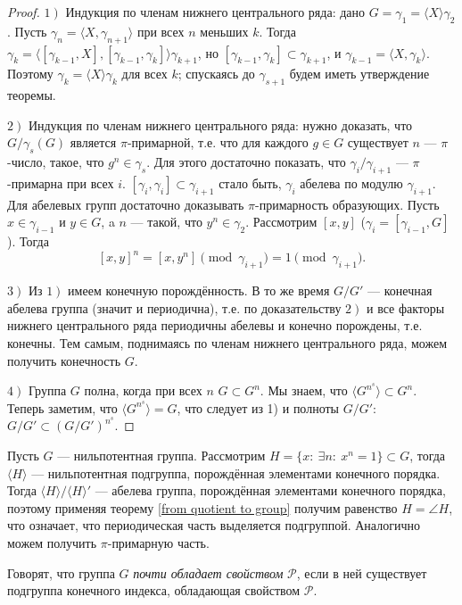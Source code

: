 \documentclass[10pt,a4paper,draft]{article}
\begin{document}
\begin{proof} $\left.1\right)$ Индукция по членам нижнего центрального
ряда: дано $G=\gamma_1=\langle X\rangle\gamma_2$. Пусть
$\gamma_n=\langle X,\gamma_{n+1}\rangle$ при всех $n$ меньших $k$.
Тогда
$\gamma_k=\langle{[\gamma_{k-1},X],[\gamma_{k-1},\gamma_k]}\rangle\gamma_{k+1}$,
но $[\gamma_{k-1},\gamma_k]\subset\gamma_{k+1}$, и
$\gamma_{k-1}=\langle X,\gamma_k\rangle$. Поэтому
$\gamma_k=\langle X\rangle\gamma_k$ для всех $k$; спускаясь до
$\gamma_{s+1}$ будем иметь утверждение теоремы.

$\left.2\right)$ Индукция по членам нижнего центрального ряда:
нужно доказать, что $G/\gamma_s(G)$ является $\pi$-примарной, т.е. что
для каждого $g\in G$ существует $n$ --- $\pi$-число, такое, что
$g^n\in\gamma_s$. Для этого достаточно показать, что
$\gamma_i/\gamma_{i+1}$ --- $\pi$-примарна при всех $i$.
$[\gamma_i,\gamma_i]\subset\gamma_{i+1}$ стало быть, $\gamma_i$
абелева по модулю $\gamma_{i+1}$. Для абелевых групп достаточно
доказывать $\pi$-примарность образующих. Пусть $x\in\gamma_{i-1}$
и $y\in G$, a $n$ --- такой, что $y^n\in\gamma_2$. Рассмотрим
$[x,y]$ ($\gamma_i=[\gamma_{i-1},G]$). Тогда
$$[x,y]^n=[x,y^n]\pmod{\gamma_{i+1}}=1\pmod{\gamma_{i+1}}.$$

$\left.3\right)$ Из $\left.1\right)$ имеем конечную порождённость.
В то же время $G/G'$
--- конечная абелева группа (значит и периодична), т.е. по доказательству $\left.2\right)$
и все факторы нижнего центрального ряда периодичны абелевы и
конечно порождены, т.е. конечны. Тем самым, поднимаясь по членам
нижнего центрального ряда, можем получить конечность $G$.

$\left.4\right)$  Группа $G$ полна, когда при всех $n$ $G\subset
G^n$. Мы знаем, что $\langle G^{n^s}\rangle\subset G^n$. Теперь
заметим, что $\langle G^{n^s}\rangle=G$, что следует из 1) и
полноты $G/G'$: $G/G'\subset(G/G')^{n^{s}}$.\end{proof}

Пусть $G$ --- нильпотентная группа. Рассмотрим $H=\{x:~\exists
n:~x^n=1\}\subset G$, тогда $\langle H\rangle$
--- нильпотентная подгруппа, порождённая элементами конечного порядка. Тогда
$\langle H\rangle/\langle H\rangle'$ --- абелева группа,
порождённая элементами конечного порядка, поэтому применяя теорему
\ref{from quotient to group} получим равенство $H=\angle{H}$, что
означает, что периодическая часть выделяется подгруппой.
Аналогично можем получить $\pi$-примарную часть.

Говорят, что группа $G$ {\em почти обладает
свойством} $\mathcal{P}$,
если в ней существует подгруппа конечного индекса, обладающая
свойством $\mathcal{P}$.
\end{document}
